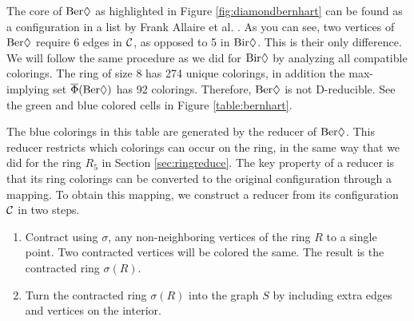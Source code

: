 The core of $\text{Ber}\Diamond$ as highlighted in Figure \ref{fig:diamondbernhart} can be found as a configuration in a list by Frank Allaire et al. \cite{frankallaire}. As you can see, two vertices of $\text{Ber}\Diamond$ require 6 edges in $\mathcal{C}$, as opposed to 5 in $\text{Bir}\Diamond$. This is their only difference. We will follow the same procedure as we did for $\text{Bir}\Diamond$ by analyzing all compatible colorings. The ring of size 8 has 274 unique colorings, in addition the max-implying set $\overline{\Phi}(\text{Ber}\Diamond)$ has 92 colorings. Therefore, $\text{Ber}\Diamond$ is not D-reducible. See the green and blue colored cells in Figure \ref{table:bernhart}.



\needspace{10cm}
The blue colorings in this table are generated by the reducer of $\text{Ber}\Diamond$. This reducer restricts which colorings can occur on the ring, in the same way that we did for the ring $R_5$ in Section \ref{sec:ringreduce}. The key property of a reducer is that its ring colorings can be converted to the original configuration through a mapping. To obtain this mapping, we  construct a reducer from its configuration $\mathcal{C}$ in two steps.
\begin{enumerate}
    \item Contract using $\sigma$, any non-neighboring vertices of the ring $R$ to a single point. Two contracted vertices will be colored the same. The result is the contracted ring $\sigma(R)$.
    \item Turn the contracted ring $\sigma(R)$ into the graph $S$ by including extra edges and vertices on the interior. 
\end{enumerate}

